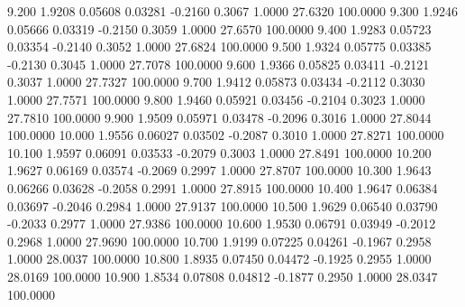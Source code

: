    9.200   1.9208   0.05608   0.03281  -0.2160   0.3067   1.0000  27.6320 100.0000
   9.300   1.9246   0.05666   0.03319  -0.2150   0.3059   1.0000  27.6570 100.0000
   9.400   1.9283   0.05723   0.03354  -0.2140   0.3052   1.0000  27.6824 100.0000
   9.500   1.9324   0.05775   0.03385  -0.2130   0.3045   1.0000  27.7078 100.0000
   9.600   1.9366   0.05825   0.03411  -0.2121   0.3037   1.0000  27.7327 100.0000
   9.700   1.9412   0.05873   0.03434  -0.2112   0.3030   1.0000  27.7571 100.0000
   9.800   1.9460   0.05921   0.03456  -0.2104   0.3023   1.0000  27.7810 100.0000
   9.900   1.9509   0.05971   0.03478  -0.2096   0.3016   1.0000  27.8044 100.0000
  10.000   1.9556   0.06027   0.03502  -0.2087   0.3010   1.0000  27.8271 100.0000
  10.100   1.9597   0.06091   0.03533  -0.2079   0.3003   1.0000  27.8491 100.0000
  10.200   1.9627   0.06169   0.03574  -0.2069   0.2997   1.0000  27.8707 100.0000
  10.300   1.9643   0.06266   0.03628  -0.2058   0.2991   1.0000  27.8915 100.0000
  10.400   1.9647   0.06384   0.03697  -0.2046   0.2984   1.0000  27.9137 100.0000
  10.500   1.9629   0.06540   0.03790  -0.2033   0.2977   1.0000  27.9386 100.0000
  10.600   1.9530   0.06791   0.03949  -0.2012   0.2968   1.0000  27.9690 100.0000
  10.700   1.9199   0.07225   0.04261  -0.1967   0.2958   1.0000  28.0037 100.0000
  10.800   1.8935   0.07450   0.04472  -0.1925   0.2955   1.0000  28.0169 100.0000
  10.900   1.8534   0.07808   0.04812  -0.1877   0.2950   1.0000  28.0347 100.0000
